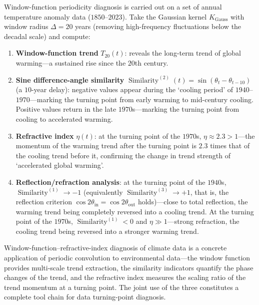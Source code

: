 \begin{example}\label{ex:window_refraction_diagnosis}
Window-function periodicity diagnosis is carried out on a set of annual temperature anomaly data ($1850$--$2023$). Take the Gaussian kernel $K_{\text{Gauss}}$ with window radius $\Delta = 20$ years (removing high-frequency fluctuations below the decadal scale) and compute:
\begin{enumerate}[label=(\roman*)]
    \item \textbf{Window-function trend} $T_{20}(t)$: reveals the long-term trend of global warming---a sustained rise since the $20$th century.
    \item \textbf{Sine difference-angle similarity} $\operatorname{Similarity}^{(2)}(t) = \sin(\theta_t - \theta_{t-10})$ (a $10$-year delay): negative values appear during the `cooling period' of $1940$--$1970$---marking the turning point from early warming to mid-century cooling. Positive values return in the late $1970$s---marking the turning point from cooling to accelerated warming.
    \item \textbf{Refractive index} $\eta(t)$: at the turning point of the $1970$s, $\eta \approx 2.3 > 1$---the momentum of the warming trend after the turning point is $2.3$ times that of the cooling trend before it, confirming the change in trend strength of `accelerated global warming'.
    \item \textbf{Reflection/refraction analysis}: at the turning point of the $1940$s, $\operatorname{Similarity}^{(1)} \to -1$ (equivalently $\operatorname{Similarity}^{(3)} \to +1$, that is, the reflection criterion $\cos 2\theta_{\text{in}} = \cos 2\theta_{\text{out}}$ holds)---close to total reflection, the warming trend being completely reversed into a cooling trend. At the turning point of the $1970$s, $\operatorname{Similarity}^{(1)} < 0$ and $\eta \gg 1$---strong refraction, the cooling trend being reversed into a stronger warming trend.
\end{enumerate}
Window-function--refractive-index diagnosis of climate data is a concrete application of periodic convolution to environmental data---the window function provides multi-scale trend extraction, the similarity indicators quantify the phase changes of the trend, and the refractive index measures the scaling ratio of the trend momentum at a turning point. The joint use of the three constitutes a complete tool chain for data turning-point diagnosis.
\end{example}

